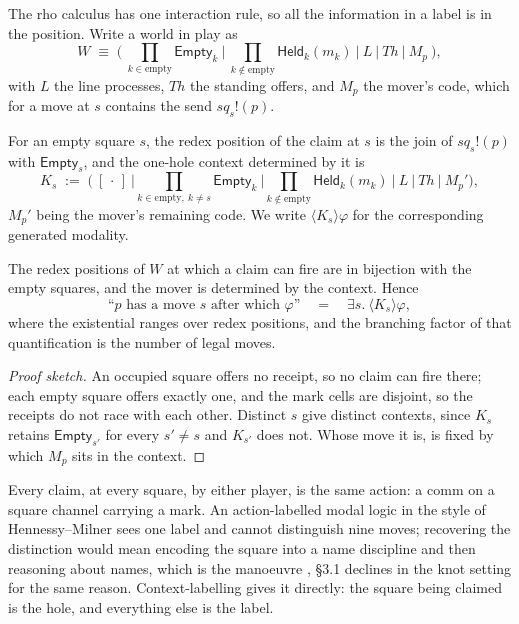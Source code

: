 The rho calculus has one interaction rule, so all the information in a label is
in the position. Write a world in play as
\[
W \;\equiv\; \Big(\ \prod_{k \in \mathrm{empty}} \mathsf{Empty}_k
\ \Big|\ \prod_{k \notin \mathrm{empty}} \mathsf{Held}_k(m_k)
\ \Big|\ L \ \Big|\ \mathit{Th} \ \Big|\ M_p \ \Big),
\]
with $L$ the line processes, $\mathit{Th}$ the standing offers, and $M_p$ the
mover's code, which for a move at $s$ contains the send $\mathit{sq}_s!(p)$.

\begin{definition}\label{gam:def:K}
For an empty square $s$, the redex position of the claim at $s$ is the join of
$\mathit{sq}_s!(p)$ with $\mathsf{Empty}_s$, and the one-hole context
determined by it is
\[
K_s \;:=\; \Big(\ [\,\cdot\,]\ \Big|
\prod_{k \in \mathrm{empty},\ k \neq s}\!\! \mathsf{Empty}_k \ \Big|
\prod_{k \notin \mathrm{empty}}\!\! \mathsf{Held}_k(m_k) \ \Big| \ L \ \Big|\
\mathit{Th} \ \Big| \ M_p' \Big) ,
\]
$M_p'$ being the mover's remaining code. We write $\langle K_s\rangle\varphi$
for the corresponding generated modality.
\end{definition}

\begin{proposition}\label{gam:prop:moves}
The redex positions of $W$ at which a claim can fire are in bijection with the
empty squares, and the mover is determined by the context. Hence
\[
\text{``$p$ has a move $s$ after which $\varphi$''}
\quad=\quad
\exists s.\ \langle K_s \rangle \varphi ,
\]
where the existential ranges over redex positions, and the branching factor of
that quantification is the number of legal moves.
\end{proposition}
\begin{proof}[Proof sketch]
An occupied square offers no receipt, so no claim can fire there; each empty
square offers exactly one, and the mark cells are disjoint, so the receipts do
not race with each other. Distinct $s$ give distinct contexts, since $K_s$
retains $\mathsf{Empty}_{s'}$ for every $s' \neq s$ and $K_{s'}$ does not.
Whose move it is, is fixed by which $M_p$ sits in the context.
\end{proof}

\begin{remark}\label{gam:why-action-label-would}
Every claim, at every square, by either player, is the same action: a comm on a
square channel carrying a mark. An action-labelled modal logic in the style of
Hennessy--Milner sees one label and cannot distinguish nine moves; recovering
the distinction would mean encoding the square into a name discipline and then
reasoning about names, which is the manoeuvre \cite{ClassifierNote}, \S3.1 declines
in the knot setting for the same reason. Context-labelling gives it directly:
the square being claimed is the hole, and everything else is the label.
\end{remark}

